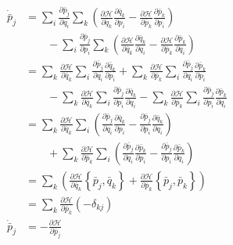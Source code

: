 \documentclass[../../../main.tex]{subfiles}
\begin{document}
\begin{align*}
	\dot{\bar{p }}_j & = \sum_i \frac{\partial \bar{p }_j }{\partial q_i } 	\sum_k \left( \frac{\partial \mathcal{H }}{\partial \bar{q }_k }\frac{\partial \bar{q }_k }{\partial p_i }-\frac{\partial \mathcal{H }}{\partial \bar{p }_k }\frac{\partial \bar{p }_k }{\partial p_i } \right)     \\
	                 & \qquad-\sum_i \frac{\partial \bar{p }_j }{\partial p_i }	\sum_k \left( \frac{\partial \mathcal{H }}{\partial \bar{q }_k }\frac{\partial \bar{q }_k }{\partial q_i }-\frac{\partial \mathcal{H }}{\partial \bar{p }_k }\frac{\partial \bar{p }_k }{\partial q_i } \right) \\
	                 & = \sum_k \frac{\partial \mathcal{H }}{\partial \bar{q }_k }\sum_i \frac{\partial \bar{p }_j }{\partial q_i}\frac{\partial \bar{q }_k }{\partial p_i}
	+ \sum_k \frac{\partial \mathcal{H }}{\partial \bar{p }_k }\sum_i \frac{\partial \bar{p }_j }{\partial q_i}\frac{\partial \bar{p }_k }{\partial p_i}                                                                                                                                        \\
	                 & \qquad
	-\sum_k \frac{\partial \mathcal{H }}{\partial \bar{q }_k }\sum_i \frac{\partial \bar{p }_j }{\partial p_i}\frac{\partial \bar{q }_k }{\partial q_i}
	-\sum_k \frac{\partial \mathcal{H }}{\partial \bar{p }_k }\sum_i \frac{\partial \bar{p }_j }{\partial p_i}\frac{\partial \bar{p }_k }{\partial q_i}                                                                                                                                         \\
	                 & = \sum_k \frac{\partial \mathcal{H }}{\partial \bar{q }_k }\sum_i 	\left( \frac{\partial \bar{p }_j }{\partial q_i }\frac{\partial \bar{q }_k }{\partial p_i} -\frac{\partial \bar{p }_j }{\partial p_i }\frac{\partial \bar{q }_k }{\partial q_i}\right)                \\
	                 & \qquad+\sum_k \frac{\partial \mathcal{H }}{\partial \bar{p }_k }\sum_i 	\left( \frac{\partial \bar{p }_j }{\partial q_i }\frac{\partial \bar{p }_k }{\partial p_i} -\frac{\partial \bar{p }_j }{\partial p_i }\frac{\partial \bar{p }_k }{\partial q_i}\right)           \\
	                 & = \sum_k \left( \frac{\partial \mathcal{H }}{\partial \bar{q }_k }\left\{ \bar{p }_j,\bar{q }_k  \right\}+\frac{\partial \mathcal{H }}{\partial \bar{p }_k }\left\{ \bar{p }_j,\bar{p }_k \right\} \right)                                                               \\
	                 & = \sum_k \frac{\partial \mathcal{H }}{\partial \bar{p }_k }\left(-\delta_{kj }\right)                                                                                                                                                                                    \\
	\dot{\bar{p }}_j & =-\frac{\partial \mathcal{H }}{\partial \bar{p }_j}
\end{align*}
\end{document}
